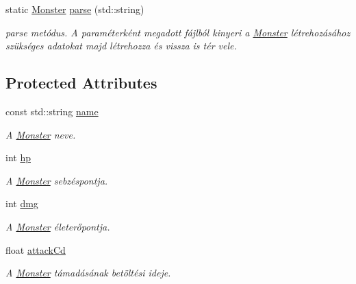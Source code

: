 \begin{DoxyCompactItemize}
static \hyperlink{classMonster}{Monster} \hyperlink{classMonster_a4317ecbc255bc541dbec3b05d2bf2280}{parse} (std\+::string)
\begin{DoxyCompactList}\small\item\em parse metódus. A paraméterként megadott fájlból kinyeri a \hyperlink{classMonster}{Monster} létrehozásához szükséges adatokat majd létrehozza és vissza is tér vele. \end{DoxyCompactList}\end{DoxyCompactItemize}
\subsection*{Protected Attributes}
\begin{DoxyCompactItemize}
\item 
\mbox{\label{classMonster_a4ce38cc9d6af5a37f54f90d2d7ab8ee0}} 
const std\+::string \hyperlink{classMonster_a4ce38cc9d6af5a37f54f90d2d7ab8ee0}{name}
\begin{DoxyCompactList}\small\item\em A \hyperlink{classMonster}{Monster} neve. \end{DoxyCompactList}\item 
\mbox{\label{classMonster_a8f5512ea0cd543721acb551d3d963486}} 
int \hyperlink{classMonster_a8f5512ea0cd543721acb551d3d963486}{hp}
\begin{DoxyCompactList}\small\item\em A \hyperlink{classMonster}{Monster} sebzéspontja. \end{DoxyCompactList}\item 
\mbox{\label{classMonster_a23d6a9678d6df28b540c3be9f102daea}} 
int \hyperlink{classMonster_a23d6a9678d6df28b540c3be9f102daea}{dmg}
\begin{DoxyCompactList}\small\item\em A \hyperlink{classMonster}{Monster} életerőpontja. \end{DoxyCompactList}\item 
\mbox{\label{classMonster_aca17d871fb61edfb970cb1d8ffbc51f6}} 
float \hyperlink{classMonster_aca17d871fb61edfb970cb1d8ffbc51f6}{attack\+Cd}
\begin{DoxyCompactList}\small\item\em A \hyperlink{classMonster}{Monster} támadásának betöltési ideje. \end{DoxyCompactList}\end{DoxyCompactItemize}


